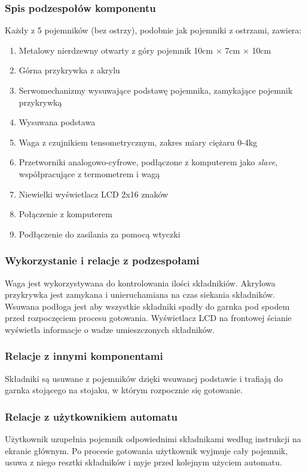 \documentclass[12pt,a4paper,notitlepage]{article}
\begin{document}
\subsubsection{Spis podzespołów komponentu}
Każdy z 5 pojemników (bez ostrzy), podobnie jak pojemniki z ostrzami, zawiera:
\begin{enumerate}
  \item Metalowy nierdzewny otwarty z góry pojemnik 10cm $\times$ 7cm $\times$ 10cm
  \item Górna przykrywka z akrylu
  \item Serwomechanizmy wysuwające podstawę pojemnika, zamykające pojemnik przykrywką
  \item Wysuwana podstawa
  \item Waga z czujnikiem tensometrycznym, zakres miary ciężaru 0-4kg
  \item Przetworniki analogowo-cyfrowe, podłączone z komputerem jako \emph{slave}, współpracujące z termometrem i wagą
  \item Niewielki wyświetlacz LCD 2x16 znaków
  \item Połączenie z komputerem
  \item Podłączenie do zasilania za pomocą wtyczki
\end{enumerate}
 
\subsubsection{Wykorzystanie i relacje z podzespołami}
Waga jest wykorzystywana do kontrolowania ilości składnikiów. Akrylowa przykrywka jest zamykana i unieruchamiana na czas siekania składników. Wsuwana podłoga jest aby wszystkie składniki spadły do garnka pod spodem przed rozpoczęciem procesu gotowania. Wyświetlacz LCD na frontowej ścianie wyświetla informacje o wadze umieszczonych składników.

\subsubsection{Relacje z innymi komponentami}
Składniki są usuwane z pojemników dzięki wsuwanej podstawie i trafiają do garnka stojącego na stojaku, w którym rozpocznie się gotowanie.

\subsubsection{Relacje z użytkownikiem automatu}
Użytkownik uzupełnia pojemnik odpowiednimi składnikami według instrukcji na ekranie głównym. Po procesie gotowania użytkownik wyjmuje cały pojemnik, usuwa z niego resztki składników i myje przed kolejnym użyciem automatu.
\end{document}
